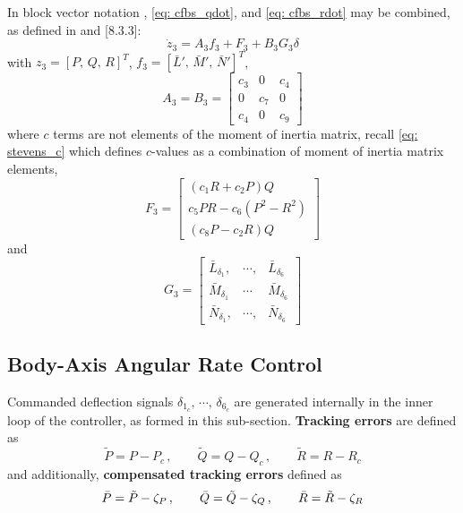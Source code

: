 \documentclass[12pt]{ucthesis}
\begin{document}
In block vector notation , \ref{eq: cfbs_qdot}, and \ref{eq: cfbs_rdot} may be combined, as defined in \citet{Farrell2005} and \citet{Farrell2006}[8.3.3]:
	\begin{equation} \label{eq: cfbs_inner_blk_dyn}
		\dot{z}_3 = A_3 f_3 + F_3 + B_3 G_3 \delta
	\end{equation}
with $z_3 = [P,\,Q,\,R]^T$, $f_3 = [\bar{L}',\,\bar{M}',\,\bar{N}']^T$, 
	\begin{equation} \label{eq: cfbs_inner_blk_dyn_A3}
		A_3 = B_3 = \left[ \begin{array}{ccc} c_3 & 0 & c_4 \\ 0 & c_7 & 0 \\ c_4 & 0 & c_9 \end{array} \right] 
	\end{equation}
where $c$ terms are not elements of the moment of inertia matrix, recall \autoref{eq: stevens_c} which defines $c$-values as a combination of moment of inertia matrix elements,
	\begin{equation} \label{eq: cfbs_inner_blk_dyn_F3}
		F_3 = \left[ \begin{array}{c}  (c_1 R + c_2 P)Q \\ c_5 PR - c_6(P^2 - R^2) \\ (c_8 P - c_2 R)Q \end{array} \right] 
	\end{equation}
and
	\begin{equation} \label{eq: cfbs_inner_blk_dyn_G3}
		G_3 = \left[ \begin{array}{ccc} \bar{L}_{\delta_1}, & \cdots, & \bar{L}_{\delta_6} \\ \bar{M}_{\delta_1} & \cdots & \bar{M}_{\delta_6} \\ \bar{N}_{\delta_1}, & \cdots, & \bar{N}_{\delta_6} \end{array} \right]
	\end{equation}

\subsection{Body-Axis Angular Rate Control}
\label{subsec: uav_body_axis}
%
Commanded deflection signals $\delta_{1_c},\,\cdots,\,\delta_{6_c}$ are generated internally in the inner loop of the controller, as formed in this sub-section. \textbf{Tracking errors} are defined as
	\begin{equation} \label{eq: cfbs_etrk_inner_loop}
		\tilde{P}	= P	- P_c 	\,,\qquad
		\tilde{Q}	= Q	- Q_c 	\,,\qquad
		\tilde{R} 	= R	- R_c
	\end{equation}
and additionally, \textbf{compensated tracking errors} defined as
	\begin{equation} \label{eq: cfbs_ecmp_inner_loop}
		\bar{P}	= \tilde{P}	- \zeta_P 	\,,\qquad
		\bar{Q}	= \tilde{Q}	- \zeta_Q 	\,,\qquad
		\bar{R}	= \tilde{R}	- \zeta_R
	\end{equation}
\end{document}
